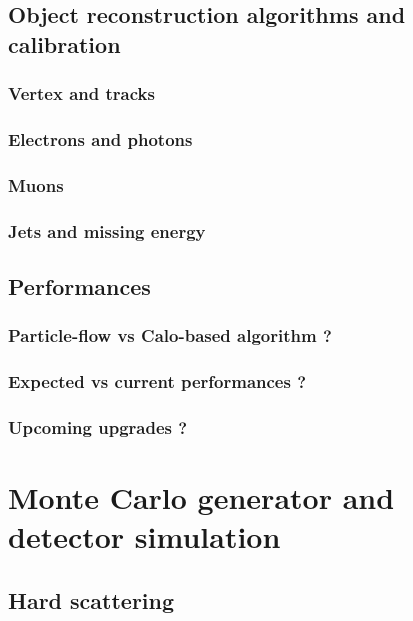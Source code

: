         \subsection{Object reconstruction algorithms and calibration}
            \subsubsection{Vertex and tracks}
        \loremipsum
            \subsubsection{Electrons and photons}
        \loremipsum
            \subsubsection{Muons}
        \loremipsum
            \subsubsection{Jets and missing energy}
        \loremipsum
        \subsection{Performances}
        \loremipsum
            \subsubsection{Particle-flow vs Calo-based algorithm ?}
        \loremipsum
            \subsubsection{Expected vs current performances ?}
        \loremipsum
            \subsubsection{Upcoming upgrades ?}
        \loremipsum

     \section{Monte Carlo generator and detector simulation}
        \loremipsum
        \subsection{Hard scattering}
        \loremipsum
